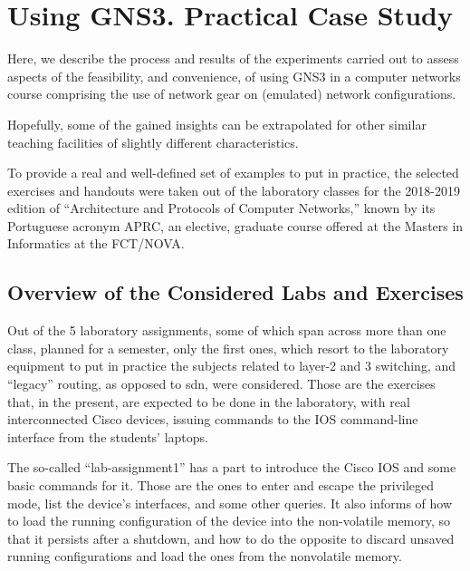 \section{Using GNS3. Practical Case Study}
\label{sec:gns3practicalcasestudy}

Here, we describe the process and results of the experiments carried out to assess aspects of the feasibility, and convenience, of using GNS3 in a computer networks course comprising the use of network gear on (emulated) network configurations.

Hopefully, some of the gained insights can be extrapolated for other similar teaching facilities of slightly different characteristics.

To provide a real and well-defined set of examples to put in practice, the selected exercises and handouts were taken out of the laboratory classes for the 2018-2019 edition of ``Architecture and Protocols of Computer Networks,'' known by its Portuguese acronym APRC, an elective, graduate course offered at the Masters in Informatics at the FCT/NOVA.

\subsection{Overview of the Considered Labs and Exercises}
\label{subsec:gns3consideredlabs}

Out of the 5 laboratory assignments, some of which span across more than one class, planned for a semester, only the first ones, which resort to the laboratory equipment to put in practice the subjects related to layer-2 and 3 switching, and ``legacy'' routing, as opposed to \gls{sdn}, were considered. %
Those are the exercises that, in the present, are expected to be done in the laboratory, with real interconnected Cisco devices, issuing commands to the IOS command-line interface from the students' laptops.

The so-called ``lab-assignment1'' has a part to introduce the Cisco IOS and some basic commands for it.
Those are the ones to enter and escape the privileged mode, list the device's interfaces, and some other queries.
It also informs of how to load the running configuration of the device into the non-volatile memory, so that it persists after a shutdown, and how to do the opposite to discard unsaved running configurations and load the ones from the nonvolatile memory.

